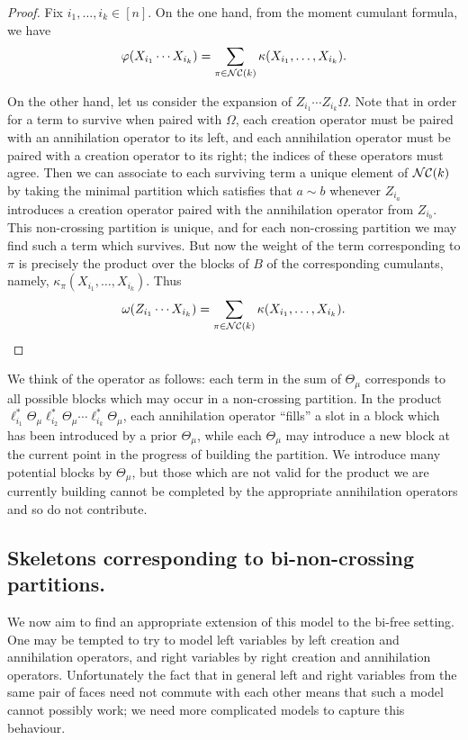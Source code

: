 \begin{proof}
	Fix $i_1, \ldots, i_k \in [n]$.
	On the one hand, from the moment cumulant formula, we have
	$$\varphi(X_{i_1}\cdots X_{i_k}) = \sum_{\pi\in\mathcal{NC}(k)}\kappa(X_{i_1}, \ldots, X_{i_k}).$$

	On the other hand, let us consider the expansion of $Z_{i_1}\cdots Z_{i_k}\Omega$.
	Note that in order for a term to survive when paired with $\Omega$, each creation operator must be paired with an annihilation operator to its left, and each annihilation operator must be paired with a creation operator to its right; the indices of these operators must agree.
	Then we can associate to each surviving term a unique element of $\mathcal{NC}(k)$ by taking the minimal partition which satisfies that $a\sim b$ whenever $Z_{i_a}$ introduces a creation operator paired with the annihilation operator from $Z_{i_b}$.
	This non-crossing partition is unique, and for each non-crossing partition we may find such a term which survives.
	But now the weight of the term corresponding to $\pi$ is precisely the product over the blocks of $B$ of the corresponding cumulants, namely, $\kappa_\pi(X_{i_1}, \ldots, X_{i_k})$.
	Thus
	$$\omega(Z_{i_1}\cdots X_{i_k}) = \sum_{\pi\in\mathcal{NC}(k)}\kappa(X_{i_1}, \ldots, X_{i_k}).$$
\end{proof}

We think of the operator as follows: each term in the sum of $\Theta_\mu$ corresponds to all possible blocks which may occur in a non-crossing partition.
In the product $\ell_{i_1}^*\Theta_\mu\ell_{i_2}^*\Theta_\mu\cdots \ell_{i_k}^*\Theta_\mu$, each annihilation operator ``fills'' a slot in a block which has been introduced by a prior $\Theta_\mu$, while each $\Theta_\mu$ may introduce a new block at the current point in the progress of building the partition.
We introduce many potential blocks by $\Theta_\mu$, but those which are not valid for the product we are currently building cannot be completed by the appropriate annihilation operators and so do not contribute.

\subsection{Skeletons corresponding to bi-non-crossing partitions.}
We now aim to find an appropriate extension of this model to the bi-free setting.
One may be tempted to try to model left variables by left creation and annihilation operators, and right variables by right creation and annihilation operators.
Unfortunately the fact that in general left and right variables from the same pair of faces need not commute with each other means that such a model cannot possibly work; we need more complicated models to capture this behaviour.

